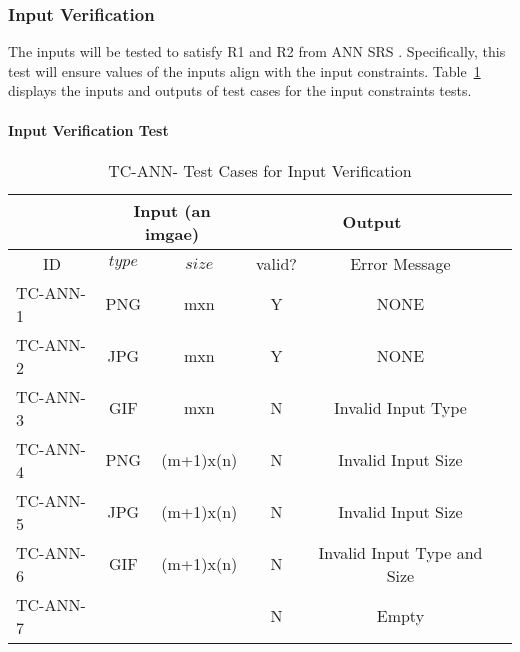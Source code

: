 \documentclass[12pt, titlepage]{article}
\begin{document}

\subsubsection{Input Verification} \label{InputVerification}

The inputs will be tested to satisfy R1 and R2 from ANN 
SRS \cite{SRS}. Specifically,
this test will ensure values of the inputs align with the input constraints.
Table~\ref{TCInput} displays the inputs and outputs of test cases for the input constraints
tests.
		
\paragraph{Input Verification Test} 
\begin{center}
  \begin{table}[h]
  \resizebox{\textwidth}{!}
  { %
      \begin{tabular}{ lccccc }
      \hline
      \multicolumn{1}{l|}{}   & \multicolumn{2}{c|}{Input (an imgae) }                            & \multicolumn{2}{c}{Output} \\ 
      
      \hline
      
      \multicolumn{1}{c|}{ID} &   $type$   &   \multicolumn{1}{c|}{$size$}   &   valid?   &   Error Message \\ \hline
      
      TC-ANN-1   &   PNG  & mxn        &  Y  & NONE               \\
      TC-ANN-2   &   JPG  & mxn        &  Y  & NONE               \\
      TC-ANN-3   &   GIF  & mxn        &  N  & Invalid Input Type  \\ 
      TC-ANN-4   &   PNG  & (m+1)x(n)  &  N  & Invalid Input Size   \\
      TC-ANN-5   &   JPG  & (m+1)x(n)  &  N  & Invalid Input Size    \\
      TC-ANN-6   &   GIF  & (m+1)x(n)  &  N  & Invalid Input Type and Size \\
      TC-ANN-7   &        &            &  N  & Empty      \\
      \hline
      
      
      \end{tabular} %
  }
  \caption{TC-ANN- Test Cases for Input Verification}
  \label{TCInput}
  \end{table}
  \end{center}
\end{document}
